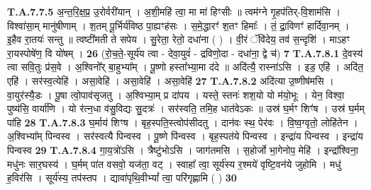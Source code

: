 \documentclass[17pt]{extarticle}
\begin{document}
                  \newline
                                                                  \textbf{ T.A.7.7.5} \newline
                  अ॒न्त॒रि॒क्ष॒प्र॒ उ॒रोर्वरी॑यान् । अ॒शी॒महि॑ त्वा॒ मा मा॑ हिꣳसीः ॥ त्वम॑ग्ने गृ॒हप॑तिर्-वि॒शाम॑सि । विश्वा॑सा॒म् मानु॑षीणाम् । श॒तम् पू॒र्भिर्य॑विष्ठ पा॒ह्यꣳह॑सः । स॒मे॒द्धारꣳ॑ श॒तꣳ हिमाः᳚ ।  तं॒ द्रा॒विणꣳ॑ हार्दिवा॒नम् । इ॒हैव रा॒तयः॑ सन्तु ॥ त्वष्टी॑मती ते सपेय । सु॒रेता॒ रेतो॒ दधा॑ना ( ) ।  वी॒रं ॅवि॑देय॒ तव॑ स॒न्दृशि॑ ।  माऽहꣳ रा॒यस्पोषे॑ण॒ वि यो॑षम् । \textbf{ 26} \newline
                  \newline
                                                        (रो॒च॒ते॒-सूर्य॑य त्वा - देवा॒युवं॑ - द्रविणो॒दा - दधा॑ना॒ द्वे च॑) \textbf{7} \newline \newline
                                \textbf{ T.A.7.8.1} \newline
                  दे॒वस्य॑ त्वा सवि॒तुः प्र॑स॒वे । अ॒श्विनो᳚र् बा॒हुभ्या᳚म् ।  पू॒ष्णो हस्ता᳚भ्या॒मा द॑दे ॥ अदि॑त्यै॒ रास्ना॑ऽसि । इड॒ एहि॑ । अदि॑त॒ एहि॑ । सर॑स्व॒त्येहि॑ । असा॒वेहि॑ ।  असा॒वेहि॑ । असा॒वेहि॑ \textbf{ 27} \newline
                  \newline
                                                                  \textbf{ T.A.7.8.2} \newline
                  अदि॑त्या उ॒ष्णीष॑मसि । वा॒युर॑स्यै॒डः । पू॒षा त्वो॒पाव॑सृजतु । अ॒श्विभ्या॒म् प्र दा॑पय । यस्ते॒ स्तनः॑ शश॒यो यो म॑यो॒भूः । येन॒ विश्वा॒ पुष्य॑सि॒ वार्या॑णि । यो र॑त्न॒धा व॑सु॒विद्यः सु॒दत्रः॑ ।  सर॑स्वति॒ तमि॒ह धात॑वेऽकः ॥ उस्र॑ घ॒र्मꣳ शिꣳ॑ष । उस्र॑ घ॒र्मम् पा॑हि \textbf{ 28} \newline
                  \newline
                                                                  \textbf{ T.A.7.8.3} \newline
                  घ॒र्माय॑ शिꣳष । बृह॒स्पति॒स्त्वोप॑सीदतु । दान॑वः स्थ॒ पेर॑वः । वि॒ष्व॒ग्वृतो॒ लोहि॑तेन । अ॒श्विभ्या᳚म् पिन्वस्व । सर॑स्वत्यै पिन्वस्व ।  पू॒ष्णे पि॑न्वस्व । बृह॒स्पत॑ये पिन्वस्व । इन्द्रा॑य पिन्वस्व । इन्द्रा॑य पिन्वस्व \textbf{ 29} \newline
                  \newline
                                                                  \textbf{ T.A.7.8.4} \newline
                  गा॒य॒त्रो॑ऽसि । त्रैष्टु॑भोऽसि । जाग॑तमसि । स॒होर्जो भा॒गेनोप॒ मेहि॑ । इन्द्रा᳚श्विना॒ मधु॑नः सार॒घस्य॑ । घ॒र्मम् पा॑त वसवो॒ यज॑ता॒ वट् । स्वाहा᳚ त्वा॒ सूर्य॑स्य र॒श्मये॑ वृष्टि॒वन॑ये जुहोमि । मधु॑ ह॒विर॑सि । सूर्य॑स्य॒ तप॑स्तप । द्यावा॑पृथि॒वीभ्यां᳚ त्वा॒ परि॑गृह्णामि ( ) \textbf{ 30} \newline
\end{document}
